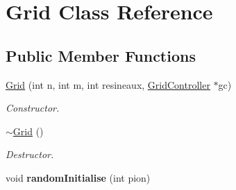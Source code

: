 \hypertarget{classGrid}{\section{Grid Class Reference}
\label{classGrid}
}
\subsection*{Public Member Functions}
\begin{DoxyCompactItemize}
\item 
\hyperlink{classGrid_acb15b1d72517594e041dce33a813467b}{Grid} (int n, int m, int resineaux, \hyperlink{classGridController}{Grid\+Controller} $\ast$gc)
\begin{DoxyCompactList}\small\item\em Constructor. \end{DoxyCompactList}\item 
\hypertarget{classGrid_a3661d0a7f998caaaf8627d7a67072116}{\hyperlink{classGrid_a3661d0a7f998caaaf8627d7a67072116}{$\sim$\+Grid} ()}\label{classGrid_a3661d0a7f998caaaf8627d7a67072116}

\begin{DoxyCompactList}\small\item\em Destructor. \end{DoxyCompactList}\item 
\hypertarget{classGrid_a6c3f6a5ef34541d89d5fe34d74fd7909}{void {\bfseries random\+Initialise} (int pion)}\label{classGrid_a6c3f6a5ef34541d89d5fe34d74fd7909}


\end{DoxyCompactItemize}
